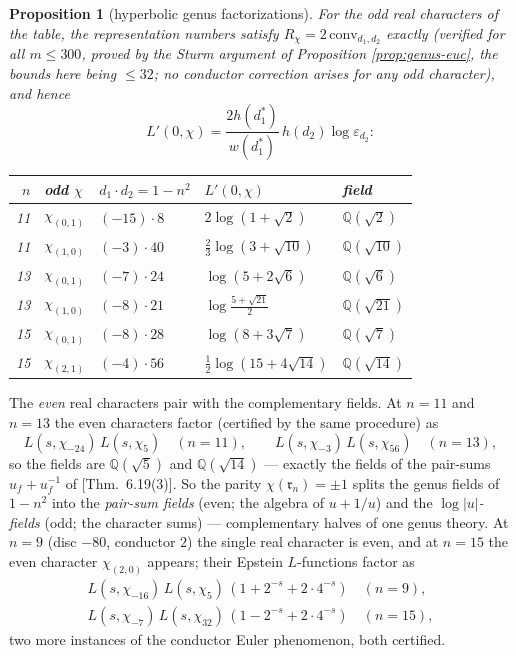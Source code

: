 \documentclass[11pt]{amsart}
\numberwithin{equation}{section}
\theoremstyle{plain}
\newtheorem{proposition}[theorem]{Proposition}
\theoremstyle{definition}
\theoremstyle{remark}
\newcommand{\Q}{\mathbb{Q}}
\newcommand{\idealr}{\mathfrak{r}}
\newcommand{\eps}{\varepsilon}
\newcommand{\PaperI}{\cite{SchmidtI}}
\begin{document}
\begin{proposition}[hyperbolic genus factorizations]\label{prop:genus-hyp}
For the odd real characters of the table, the representation numbers
satisfy $R_\chi = 2\,\mathrm{conv}_{d_1,d_2}$ exactly (verified for all $m
\le 300$, proved by the Sturm argument of Proposition
\ref{prop:genus-euc}, the bounds here being $\le 32$; no conductor
correction arises for any odd character), and hence
\[
  L'(0,\chi) = \frac{2h(d_1^*)}{w(d_1^*)}\,h(d_2)\log\eps_{d_2} :
\]
\begin{center}
\small
\begin{tabular}{@{}rllll@{}}
\toprule
$n$ & odd $\chi$ & $d_1\cdot d_2 = 1 - n^2$ & $L'(0,\chi)$ & field\\
\midrule
11 & $\chi_{(0,1)}$ & $(-15)\cdot 8$ & $2\log(1 + \sqrt2)$ & $\Q(\sqrt2)$\\
11 & $\chi_{(1,0)}$ & $(-3)\cdot 40$ & $\tfrac23\log(3 + \sqrt{10})$ & $\Q(\sqrt{10})$\\
13 & $\chi_{(0,1)}$ & $(-7)\cdot 24$ & $\log(5 + 2\sqrt6)$ & $\Q(\sqrt6)$\\
13 & $\chi_{(1,0)}$ & $(-8)\cdot 21$ & $\log\tfrac{5 + \sqrt{21}}2$ & $\Q(\sqrt{21})$\\
15 & $\chi_{(0,1)}$ & $(-8)\cdot 28$ & $\log(8 + 3\sqrt7)$ & $\Q(\sqrt7)$\\
15 & $\chi_{(2,1)}$ & $(-4)\cdot 56$ & $\tfrac12\log(15 + 4\sqrt{14})$ & $\Q(\sqrt{14})$\\
\bottomrule
\end{tabular}
\end{center}
\end{proposition}

The \emph{even} real characters pair with the complementary fields.  At
$n = 11$ and $n = 13$ the even characters factor (certified by the same
procedure) as
\[
  L(s,\chi_{-24})\,L(s,\chi_5)\quad (n = 11),
  \qquad
  L(s,\chi_{-3})\,L(s,\chi_{56})\quad (n = 13),
\]
so the fields are $\Q(\sqrt5)$ and $\Q(\sqrt{14})$ --- exactly the fields
of the pair-sums $u_f + u_f^{-1}$ of \PaperI[Thm.~6.19(3)].  So the
parity $\chi(\idealr_n) = \pm1$ splits the genus fields of $1 - n^2$ into
the \emph{pair-sum fields} (even; the algebra of $u + 1/u$) and the
\emph{$\log|u|$-fields} (odd; the character sums) --- complementary
halves of one genus theory.  At $n = 9$ (disc $-80$, conductor $2$) the
single real character is even, and at $n = 15$ the even character
$\chi_{(2,0)}$ appears; their Epstein $L$-functions factor as
\begin{gather*}
  L(s,\chi_{-16})\,L(s,\chi_5)\,(1 + 2^{-s} + 2\cdot4^{-s})\quad (n = 9),\\
  L(s,\chi_{-7})\,L(s,\chi_{32})\,(1 - 2^{-s} + 2\cdot4^{-s})\quad (n = 15),
\end{gather*}
two more instances of the conductor Euler phenomenon, both certified.
\end{document}
